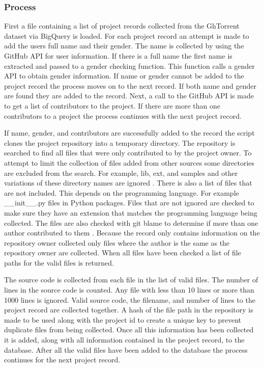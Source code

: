 \documentclass[12pt]{article}
\begin{document}
\subsubsection*{Process}
First a file containing a list of project records collected from the GhTorrent dataset via BigQuery is loaded. For each project record an attempt is made to add the users full name and their gender. The name is collected by using the GitHub API for user information. If there is a full name the first name is extracted and passed to a gender checking function. This function calls a gender API to obtain gender information. If name or gender cannot be added to the project record the process moves on to the next record. If both name and gender are found they are added to the record. Next, a call to the GitHub API is made to get a list of contributors to the project. If there are more than one contributors to a project the process continues with the next project record.

If name, gender, and contributors are successfully added to the record the script clones the project repository into a temporary directory. The repository is searched to find all files that were only contributed to by the project owner. To attempt to limit the collection of files added from other sources some directories are excluded from the search. For example, lib, ext, and samples and other variations of these directory names are ignored \cite{Matyukhina2019}. There is also a list of files that are not included. This depends on the programming language. For example {\_\_}init{\_\_}.py files in Python packages. Files that are not ignored are checked to make sure they have an extension that matches the programming language being collected. The files are also checked with git blame to determine if more than one author contributed to them \cite{Wisse2015}. Because the record only contains information on the repository owner collected only files where the author is the same as the repository owner are collected. When all files have been checked a list of file paths for the valid files is returned.

The source code is collected from each file in the list of valid files. The number of lines in the source code is counted. Any file with less than 10 lines or more than 1000 lines is ignored. Valid source code, the filename, and number of lines to the project record are collected together. A hash of the file path in the repository is made to be used along with the project id to create a unique key to prevent duplicate files from being collected. Once all this information has been collected it is added, along with all information contained in the project record, to the database. After all the valid files have been added to the database the process continues for the next project record.
\end{document}
